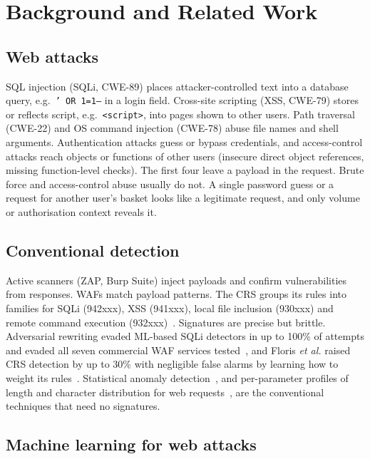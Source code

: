 \documentclass[conference]{IEEEtran}
\begin{document}
\section{Background and Related Work}

\subsection{Web attacks}

SQL injection (SQLi, CWE-89) places attacker-controlled text into a database query, e.g.\ \texttt{' OR 1=1--} in a login field. Cross-site scripting (XSS, CWE-79) stores or reflects script, e.g.\ \texttt{<script>}, into pages shown to other users. Path traversal (CWE-22) and OS command injection (CWE-78) abuse file names and shell arguments. Authentication attacks guess or bypass credentials, and access-control attacks reach objects or functions of other users (insecure direct object references, missing function-level checks). The first four leave a payload in the request. Brute force and access-control abuse usually do not. A single password guess or a request for another user's basket looks like a legitimate request, and only volume or authorisation context reveals it.

\subsection{Conventional detection}

Active scanners (ZAP, Burp Suite) inject payloads and confirm vulnerabilities from responses. WAFs match payload patterns. The CRS groups its rules into families for SQLi (942xxx), XSS (941xxx), local file inclusion (930xxx) and remote command execution (932xxx)~\cite{crs}. Signatures are precise but brittle. Adversarial rewriting evaded ML-based SQLi detectors in up to 100\% of attempts and evaded all seven commercial WAF services tested~\cite{qu2024}, and Floris \emph{et al.} raised CRS detection by up to 30\% with negligible false alarms by learning how to weight its rules~\cite{floris2025}. Statistical anomaly detection~\cite{denning1987}, and per-parameter profiles of length and character distribution for web requests~\cite{kruegel2003}, are the conventional techniques that need no signatures.

\subsection{Machine learning for web attacks}
\end{document}
